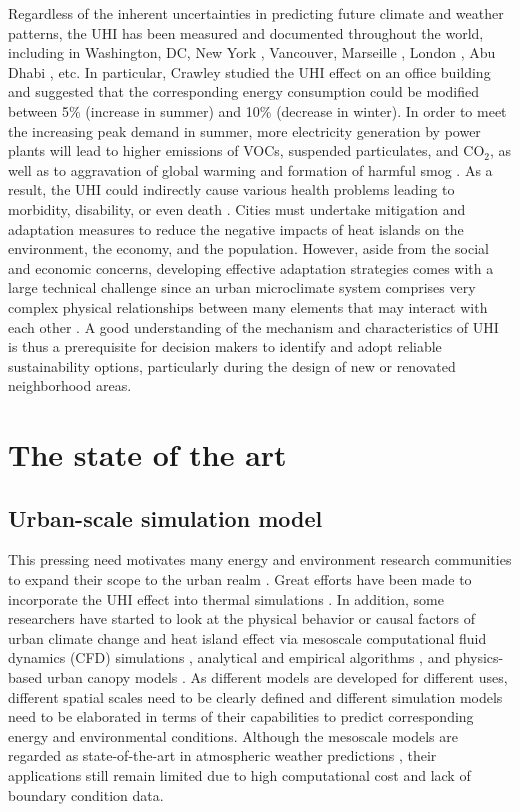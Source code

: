 Regardless of the inherent uncertainties in predicting future climate and weather patterns, the UHI has been measured and documented throughout the world, including in Washington, DC, New York \cite{hicks2010heat}, Vancouver, Marseille \cite{lee2008vegetated}, London \cite{kolokotroni2012london}, Abu Dhabi \cite{martin2015estimation}, etc. In particular, Crawley \cite{crawley2008estimating} studied the UHI effect on an office building and suggested that the corresponding energy consumption could be modified between 5\% (increase in summer) and 10\% (decrease in winter). In order to meet the increasing peak demand in summer, more electricity generation by power plants will lead to higher emissions of VOCs, suspended particulates, and CO$_2$, as well as to aggravation of global warming and formation of harmful smog \cite{gorsevski1998air}. As a result, the UHI could indirectly cause various health problems leading to morbidity, disability, or even death \cite{gabriel2011urban}. Cities must undertake mitigation and adaptation measures to reduce the negative impacts of heat islands on the environment, the economy, and the population. However, aside from the social and economic concerns, developing effective adaptation strategies comes with a large technical challenge since an urban microclimate system comprises very complex physical relationships between many elements that may interact with each other \cite{masson2014adapting}. A good understanding of the mechanism and characteristics of UHI is thus a prerequisite for decision makers to identify and adopt reliable sustainability options, particularly during the design of new or renovated neighborhood areas.



\section{The state of the art}\label{ch1:opts}

\subsection{Urban-scale simulation model}
This pressing need motivates many energy and environment research communities to expand their scope to the urban realm \cite{reinhart2016urban}. Great efforts have been made to incorporate the UHI effect into thermal simulations \cite{salamanca2010new, crawley2008estimating, oxizidis2008computational}. In addition, some researchers have started to look at the physical behavior or causal factors of urban climate change and heat island effect via mesoscale computational fluid dynamics (CFD) simulations \cite{li2013multi}, analytical and empirical algorithms \cite{ignatius2015urban}, and physics-based urban canopy models \cite{lee2008vegetated}. As different models are developed for different uses, different spatial scales need to be clearly defined and different simulation models need to be elaborated in terms of their capabilities to predict corresponding energy and environmental conditions. Although the mesoscale models are regarded as state-of-the-art in atmospheric weather predictions \cite{roth2007review}, their applications still remain limited due to high computational cost and lack of boundary condition data.

